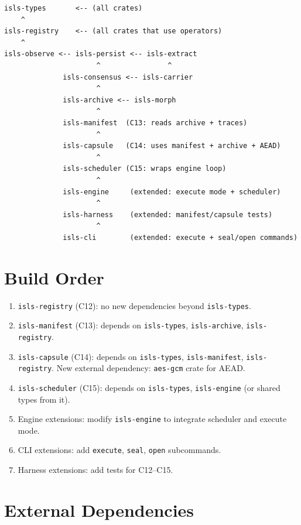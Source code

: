 \documentclass[11pt,a4paper,twoside]{article}
\theoremstyle{definition}
\theoremstyle{plain}
\theoremstyle{remark}
\begin{document}
\begin{verbatim}
isls-types       <-- (all crates)
    ^
isls-registry    <-- (all crates that use operators)
    ^
isls-observe <-- isls-persist <-- isls-extract
                      ^                ^
              isls-consensus <-- isls-carrier
                      ^
              isls-archive <-- isls-morph
                      ^
              isls-manifest  (C13: reads archive + traces)
                      ^
              isls-capsule   (C14: uses manifest + archive + AEAD)
                      ^
              isls-scheduler (C15: wraps engine loop)
                      ^
              isls-engine     (extended: execute mode + scheduler)
                      ^
              isls-harness    (extended: manifest/capsule tests)
                      ^
              isls-cli        (extended: execute + seal/open commands)
\end{verbatim}

\section{Build Order}\label{sec:buildorder}

\begin{enumerate}[nosep]
  \item \texttt{isls-registry} (C12): no new dependencies beyond
        \texttt{isls-types}.
  \item \texttt{isls-manifest} (C13): depends on \texttt{isls-types},
        \texttt{isls-archive}, \texttt{isls-registry}.
  \item \texttt{isls-capsule} (C14): depends on \texttt{isls-types},
        \texttt{isls-manifest}, \texttt{isls-registry}. New external
        dependency: \texttt{aes-gcm} crate for AEAD.
  \item \texttt{isls-scheduler} (C15): depends on \texttt{isls-types},
        \texttt{isls-engine} (or shared types from it).
  \item Engine extensions: modify \texttt{isls-engine} to integrate
        scheduler and execute mode.
  \item CLI extensions: add \texttt{execute}, \texttt{seal},
        \texttt{open} subcommands.
  \item Harness extensions: add tests for C12--C15.
\end{enumerate}

\section{External Dependencies}\label{sec:extdeps}
\end{document}
